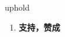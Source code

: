 
\begin{frame}
{\huge uphold}
\begin{center}
\begin{enumerate}\Large
  \item \textbf{支持，赞成}
\end{enumerate}
\end{center}
\end{frame}
